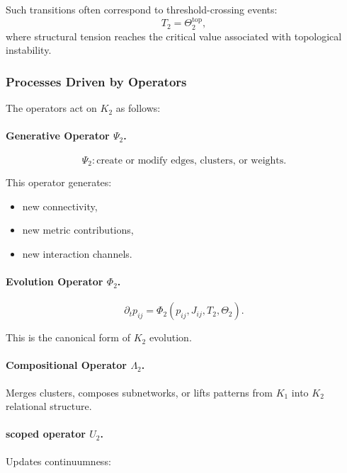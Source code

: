 Such transitions often correspond to threshold-crossing events:
\[
T_2 = \Theta_2^{\text{top}},
\]
where structural tension reaches the critical value associated with
topological instability.

\subsubsection{Processes Driven by Operators}

The operators act on $K_2$ as follows:

\paragraph{Generative Operator \texorpdfstring{$\Psi_2$}{\Psi_2}.}
\[
\Psi_2: \text{create or modify edges, clusters, or weights}.
\]

This operator generates:

\begin{itemize}
    \item new connectivity,
    \item new metric contributions,
    \item new interaction channels.
\end{itemize}

\paragraph{Evolution Operator \texorpdfstring{$\Phi_2$}{\Phi_2}.}

\[
\partial_t p_{ij} = \Phi_2(p_{ij}, J_{ij}, T_2, \Theta_2).
\]

This is the canonical form of $K_2$ evolution.

\paragraph{Compositional Operator \texorpdfstring{$\Lambda_2$}{\Lambda_2}.}

Merges clusters, composes subnetworks, or lifts patterns from $K_1$ into
$K_2$ relational structure.

\paragraph{scoped operator \texorpdfstring{$U_2$}{U_2}.}

Updates continuumness:


